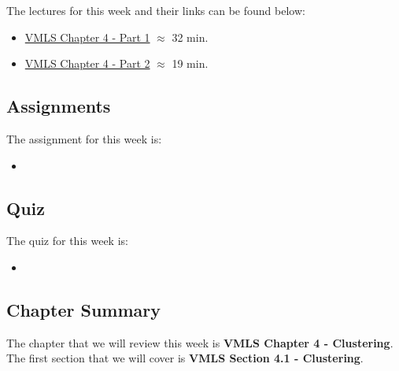 The lectures for this week and their links can be found below:

\begin{itemize}
    \item \href{https://www.youtube.com/watch?v=liaZ_SCuE1w&list=PLoROMvodv4rMz-WbFQtNUsUElIh2cPmN9&index=14}{VMLS Chapter 4 - Part 1} $\approx$ 32 min.
    \item \href{https://www.youtube.com/watch?v=a4GjONqojzM&list=PLoROMvodv4rMz-WbFQtNUsUElIh2cPmN9&index=15}{VMLS Chapter 4 - Part 2} $\approx$ 19 min.
\end{itemize}

\subsection{Assignments}

The assignment for this week is:

\begin{itemize}
    \item {}
\end{itemize}

\subsection{Quiz}

The quiz for this week is:

\begin{itemize}
    \item {}
\end{itemize}

\subsection{Chapter Summary}

The chapter that we will review this week is \textbf{VMLS Chapter 4 - Clustering}. The first section that we will cover is \textbf{VMLS Section 4.1 - Clustering}.

